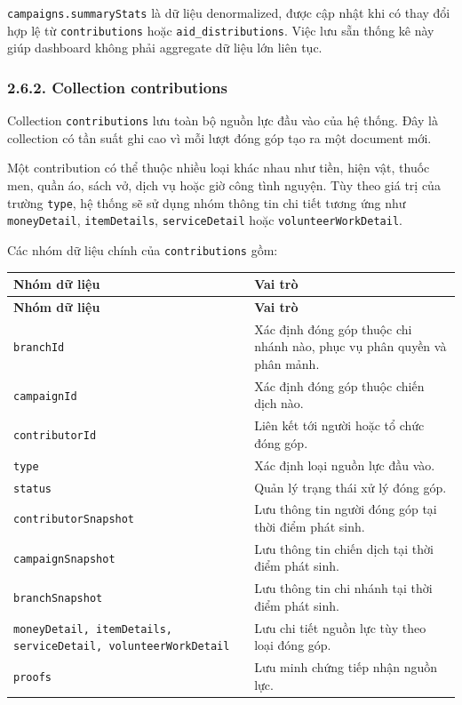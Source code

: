 \documentclass[12pt,a4paper]{article}
\begin{document}
\texttt{campaigns.summaryStats} là dữ liệu denormalized, được cập nhật khi có thay đổi hợp lệ từ \texttt{contributions} hoặc \texttt{aid\_distributions}. Việc lưu sẵn thống kê này giúp dashboard không phải aggregate dữ liệu lớn liên tục.

\subsubsection*{2.6.2. Collection contributions}

Collection \texttt{contributions} lưu toàn bộ nguồn lực đầu vào của hệ thống. Đây là collection có tần suất ghi cao vì mỗi lượt đóng góp tạo ra một document mới.

Một contribution có thể thuộc nhiều loại khác nhau như tiền, hiện vật, thuốc men, quần áo, sách vở, dịch vụ hoặc giờ công tình nguyện. Tùy theo giá trị của trường \texttt{type}, hệ thống sẽ sử dụng nhóm thông tin chi tiết tương ứng như \texttt{moneyDetail}, \texttt{itemDetails}, \texttt{serviceDetail} hoặc \texttt{volunteerWorkDetail}.

Các nhóm dữ liệu chính của \texttt{contributions} gồm:

\begin{center}
\small
\begin{longtable}{|p{4cm}|p{8.5cm}|}
\hline
\textbf{Nhóm dữ liệu} & \textbf{Vai trò} \\ \hline
\endfirsthead
\hline
\textbf{Nhóm dữ liệu} & \textbf{Vai trò} \\ \hline
\endhead
\texttt{branchId} & Xác định đóng góp thuộc chi nhánh nào, phục vụ phân quyền và phân mảnh. \\ \hline
\texttt{campaignId} & Xác định đóng góp thuộc chiến dịch nào. \\ \hline
\texttt{contributorId} & Liên kết tới người hoặc tổ chức đóng góp. \\ \hline
\texttt{type} & Xác định loại nguồn lực đầu vào. \\ \hline
\texttt{status} & Quản lý trạng thái xử lý đóng góp. \\ \hline
\texttt{contributorSnapshot} & Lưu thông tin người đóng góp tại thời điểm phát sinh. \\ \hline
\texttt{campaignSnapshot} & Lưu thông tin chiến dịch tại thời điểm phát sinh. \\ \hline
\texttt{branchSnapshot} & Lưu thông tin chi nhánh tại thời điểm phát sinh. \\ \hline
\texttt{moneyDetail, itemDetails, serviceDetail, volunteerWorkDetail} & Lưu chi tiết nguồn lực tùy theo loại đóng góp. \\ \hline
\texttt{proofs} & Lưu minh chứng tiếp nhận nguồn lực. \\ \hline
\end{longtable}
\normalsize
\end{center}
\end{document}
